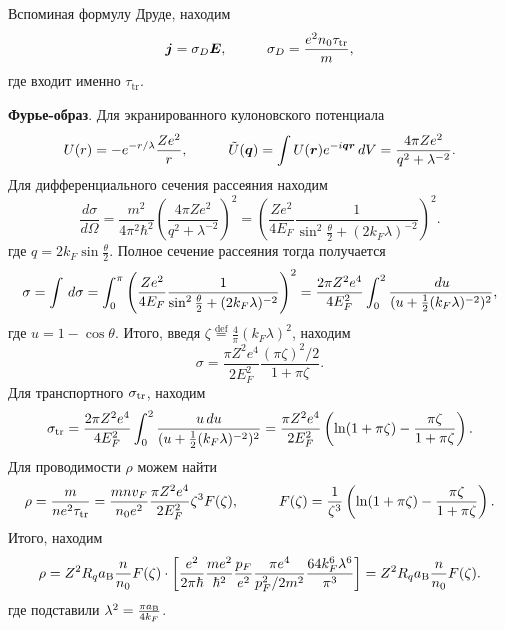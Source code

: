 Вспоминая формулу Друде, находим
\begin{equation*}
	\vc{j} = \sigma_D \vc{E},
	\hspace{10 mm} 
	\sigma_D = \frac{e^2 n_0 \sub{\tau}{tr}}{m},
\end{equation*}
где входит именно $\tau_{\text{tr}}$.





\textbf{Фурье-образ}. Для экранированного кулоновского потенциала 
\begin{equation*}
	U(r) = - e^{-r/\lambda} \frac{Z e^2}{r},
	\hspace{10 mm} 
	\tilde{U}(\vc{q}) = \int U(\vc{r}) e^{-i \vc{q} \vc{r}} \d V = \frac{4 \pi Z e^2}{q^2 + \lambda^{-2}}.
\end{equation*}
Для дифференциального сечения рассеяния находим
\begin{equation*}
	\frac{d \sigma}{d \Omega} = \frac{m^2}{4 \pi^2 \hbar^2} \left(
		\frac{4\pi Z e^2}{q^2+\lambda^{-2}}
	\right)^2 = \left(
		\frac{Z e^2}{4 E_F} \frac{1}{\sin^2 \frac{\theta}{2} + (2 k_F \lambda)^{-2}}
	\right)^2.
\end{equation*}
где $q = 2 k_F \sin \frac{\theta}{2}$.
Полное сечение рассеяния тогда получается
\begin{equation*}
	\sigma = \int \, d \sigma = \int_{0}^{\pi} \left(
		\frac{Z e^2}{4 E_F} \frac{1}{\sin^2 \frac{\theta}{2} + (2 k_F \lambda)^{-2}}
	\right)^2 = \frac{2\pi Z^2 e^4}{4 E_F^2} \int_{0}^{2}  \frac{\, d u}{(u + \frac{1}{2}(k_F \lambda)^{-2})^2},
\end{equation*}
где $u = 1 - \cos \theta$.  Итого, введя $\zeta \overset{\mathrm{def}}{=}  \frac{4}{\pi} (k_F \lambda)^2$, находим
\begin{equation*}
	\sigma = \frac{\pi Z^2 e^4}{2 E_F^2} \frac{(\pi \zeta)^2/2}{1 + \pi \zeta}.
\end{equation*}
Для транспортного $\sigma_{\textnormal{tr}}$, находим
\begin{equation*}
	\sigma_{\textnormal{tr}} = \frac{2\pi Z^2 e^4}{4 E_F^2} \int_{0}^{2}  \frac{u \, d u}{(u + \frac{1}{2}(k_F \lambda)^{-2})^2} = \frac{\pi Z^2 e^4}{2 E_F^2} \left(
		\ln(1+\pi \zeta) - \frac{\pi \zeta}{1+\pi \zeta}
	\right).
\end{equation*}
Для проводимости $\rho$ можем найти
\begin{equation*}
	\rho = \frac{m}{n e^2 \sub{\tau}{tr}} = \frac{m n v_F}{n_0 e^2} \frac{\pi Z^2 e^4}{2 E_F^2} \zeta^3 F(\zeta),
	\hspace{10 mm} 
	F(\zeta) = \frac{1}{\zeta^3} \left(
		\ln(1+\pi \zeta) - \frac{\pi \zeta}{1+\pi \zeta}
	\right).
\end{equation*}
Итого, находим
\begin{equation}
	\rho = Z^2 R_q a_{\textnormal{B}} \frac{n}{n_0} F(\zeta) \cdot \left[
		\frac{e^2}{2 \pi \hbar} \frac{m e^2}{\hbar^2} \frac{p_F}{e^2} \frac{\pi e^4}{p_F^2/2m^2} \frac{64 k_F^6 \lambda^6}{\pi^3}
	\right] = Z^2 R_q a_{\textnormal{B}} \frac{n}{n_0} F(\zeta).
\end{equation}
где подставили $\lambda^2 = \frac{\pi a_{\textnormal{B}}}{4 k_F}$.
